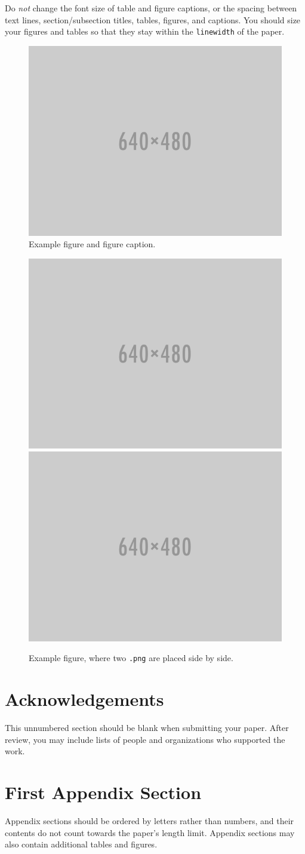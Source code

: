 \documentclass{anthology-ch}         %
\begin{document}
Do \textit{not} change the font size of table and figure captions, or the spacing between text lines, section/subsection titles, tables, figures, and captions. You should size your figures and tables so that they stay within the \texttt{linewidth} of the paper. 

\begin{figure}[t!]
  \centering
  \includegraphics[width=0.4\linewidth]{640x480.png}
  \caption{Example figure and figure caption.}
  \label{fig:example}
\end{figure}

\begin{figure}[t!]
  \centering
  \includegraphics[width=0.4\linewidth]{640x480.png}
  \includegraphics[width=0.4\linewidth]{640x480.png}
  \caption{Example figure, where two \texttt{.png} are placed side by side.}
  \label{fig:example_bigger}
\end{figure}

\section*{Acknowledgements}

This unnumbered section should be blank when submitting your paper. After review, you may include lists of people and organizations who supported the work.

\printbibliography

\appendix

\section{First Appendix Section} \label{appdx:first}

Appendix sections should be ordered by letters rather than numbers, and their contents do not count towards the paper's length limit. Appendix sections may also contain additional tables and figures.  
\end{document}
